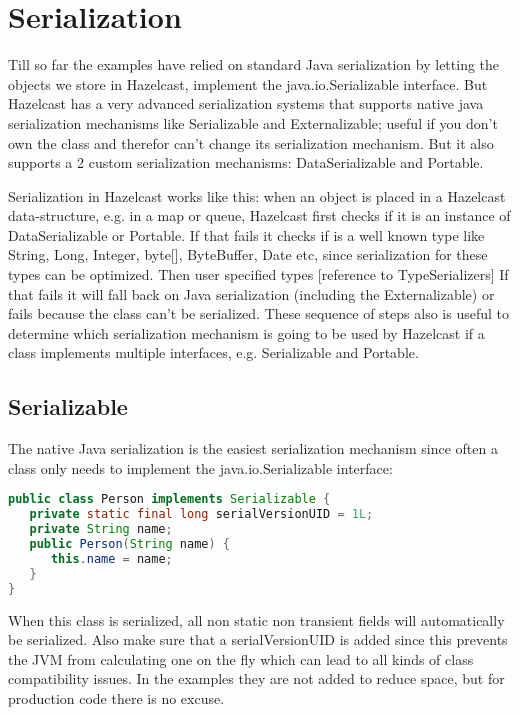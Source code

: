 \chapter{Serialization}
Till so far the examples have relied on standard Java serialization by letting the objects we store in Hazelcast, implement the java.io.Serializable interface. But Hazelcast has a very advanced serialization systems that supports native java serialization mechanisms like Serializable and Externalizable;  useful if you don't own the class and therefor can't change its serialization mechanism. But it also supports a 2 custom serialization mechanisms: DataSerializable and Portable.

Serialization in Hazelcast works like this: when an object is placed in a Hazelcast data-structure, e.g. in a map or queue, Hazelcast first checks if it is an instance of DataSerializable or Portable. If that fails it checks if is a well known type like String, Long, Integer, byte[], ByteBuffer, Date etc, since serialization for these types can be optimized. Then user specified types [reference to TypeSerializers] If that fails it will fall back on Java serialization (including the Externalizable) or fails because the class can't be serialized. These sequence of steps also is useful to determine which serialization mechanism is going to be used by Hazelcast if a class implements multiple interfaces, e.g. Serializable and Portable.

\section{Serializable}
The native Java serialization is the easiest serialization mechanism since often a class only needs to implement the java.io.Serializable interface:
\begin{lstlisting}[language=java]
public class Person implements Serializable {
   private static final long serialVersionUID = 1L;
   private String name;
   public Person(String name) {
      this.name = name; 
   }
}
\end{lstlisting}
When this class is serialized, all non static non transient fields will automatically be serialized. Also make sure that a serialVersionUID is added since this prevents the JVM from calculating one on the fly which can lead to all kinds of class compatibility issues. In the examples they are not added to reduce space, but for production code there is no excuse.

